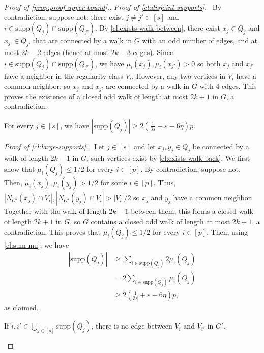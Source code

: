 \documentclass{article}
\newcommand{\supp}{\text{supp}}
\newcommand{\mydiamond}{\rotatebox[origin=c]{45}{$\vcenter{\hbox{$\Box$}}$}}
\newenvironment{subproof}[1]{\par\noindent \textit{Proof of #1.}\ }{\hfill \mydiamond \par\vspace{11pt}}
\begin{document}
\begin{proof}[Proof of \cref{prop:proof-upper-bound}.]
    \begin{subproof}{\cref{cl:disjoint-supports}}
        By contradiction, suppose not: there exist $j \neq j' \in [s]$ and $i \in \supp(Q_j) \cap \supp(Q_{j'})$.
        By \cref{cl:exists-walk-between}, there exist $x_j \in Q_j$ and $x_{j'} \in Q_{j'}$ that are connected by a walk in $G$ with an odd number of edges, and at most $2k-2$ edges (hence at most $2k-3$ edges).
        Since $i \in \supp(Q_j) \cap \supp(Q_{j'})$, we have $\mu_i(x_j), \mu_i(x_{j'}) > 0$ so both $x_j$ and $x_{j'}$ have a neighbor in the regularity class $V_i$.
        However, any two vertices in $V_i$ have a common neighbor, so $x_j$ and $x_{j'}$ are connected by a walk in $G$ with $4$ edges.
        This proves the existence of a closed odd walk of length at most $2k+1$ in $G$, a contradiction.
    \end{subproof}

    \begin{claim}\label{cl:large-supports}
        For every $j \in [s]$, we have $|\supp(Q_j)| \geq 2\left(\frac{1}{3s}+\varepsilon-6\eta\right)p$.
    \end{claim}

    \begin{subproof}{\cref{cl:large-supports}}
        Let $j \in [s]$ and let $x_j, y_j \in Q_j$ be connected by a walk of length $2k-1$ in $G$; such vertices exist by \cref{cl:exists-walk-back}.
        We first show that $\mu_i(Q_j) \leq 1/2$ for every $i \in [p]$.
        By contradiction, suppose not. 
        Then, $\mu_i(x_j), \mu_i(y_j) > 1/2$ for some $i \in [p]$.
        Thus, $|N_{G'}(x_j) \cap V_i|, |N_{G'}(y_j) \cap V_i| > |V_i|/2$ so $x_j$ and $y_j$ have a common neighbor. Together with the walk of length $2k-1$ between them, this forms a closed walk of length $2k+1$ in $G$, so $G$ contains a closed odd walk of length at most $2k+1$, a contradiction.
        This proves that $\mu_i(Q_j) \leq 1/2$ for every $i \in [p]$.
        Then, using \cref{cl:sum-mu}, we have \begin{align*}
            |\supp(Q_j)| &\geq \sum_{i \in \supp(Q_j)}2\mu_i(Q_j) \\
            &= 2 \sum_{i \in \supp(Q_j)}\mu_i(Q_j) \\
            &\geq 2\left(\frac{1}{3s}+\varepsilon-6\eta\right)p,
        \end{align*}
        as claimed.
    \end{subproof}

    \begin{claim}\label{cl:supp-edgeless}
        If $i, i' \in \bigcup_{j \in [s]} \supp(Q_j)$, there is no edge between $V_i$ and $V_{i'}$ in $G'$.
    \end{claim}


\end{proof}
\end{document}
